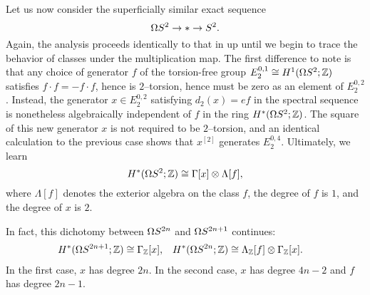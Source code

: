 \begin{example}
Let us now consider the superficially similar exact sequence \[\Omega S^2 \to * \to S^2.\]
Again, the analysis proceeds identically to that in  up until we begin to trace the behavior of classes under the multiplication map.
The first difference to note is that any choice of generator $f$ of the torsion-free group $E_2^{0,1} \cong H^1(\Omega S^2; \mathbb Z)$ satisfies $f \cdot f = - f \cdot f$, hence is $2$--torsion, hence must be zero as an element of $E_2^{0, 2}$.
Instead, the generator $x \in E_2^{0, 2}$ satisfying $d_2(x) = ef$ in the spectral sequence is nonetheless algebraically independent of $f$ in the ring $H^*(\Omega S^2; \mathbb Z)$.
The square of this new generator $x$ is not required to be $2$--torsion, and an identical calculation to the previous case shows that $x^{[2]}$ generates $E_2^{0, 4}$.
Ultimately, we learn \[H^*(\Omega S^2; \mathbb Z) \cong \Gamma[x] \otimes \Lambda[f],\] where $\Lambda[f]$ denotes the exterior algebra on the class $f$, the degree of $f$ is $1$, and the degree of $x$ is $2$.
\end{example}

\begin{remark}\label{CohLoopsSphere}
In fact, this dichotomy between $\Omega S^{2n}$ and $\Omega S^{2n+1}$ continues:
\begin{align*}
H^*(\Omega S^{2n+1}; \mathbb Z) & \cong \Gamma_{\mathbb Z}[x], &
H^*(\Omega S^{2n}; \mathbb Z) & \cong \Lambda_{\mathbb Z}[f] \otimes \Gamma_{\mathbb Z}[x].
\end{align*}
In the first case, $x$ has degree $2n$.
In the second case, $x$ has degree $4n-2$ and $f$ has degree $2n-1$.
\end{remark}


